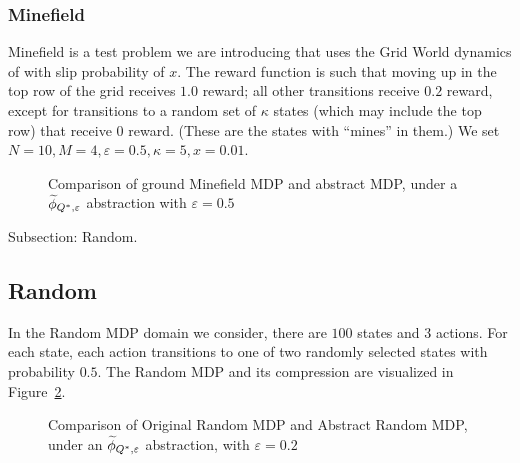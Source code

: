 \subsubsection{Minefield}
Minefield is a test problem we are introducing that uses the Grid World dynamics of \citet{russell1995modern} with slip probability of $x$. The reward function is such that moving up in the top row of the grid receives $1.0$ reward; all other transitions receive $0.2$ reward, except for transitions to a random set of $\kappa$ states (which may include the top row) that receive $0$ reward. (These are the states with ``mines'' in them.) We set $N=10, M=4, \varepsilon=0.5, \kappa = 5, x = 0.01$.
\begin{figure}[h]
\centering
{}
\hspace{6mm}
\caption{Comparison of ground Minefield \ac{MDP} and abstract \ac{MDP}, under a $\widetilde \phi_{Q^*,\varepsilon}$ abstraction with $
\varepsilon=0.5$}
\label{fig:minefield-vis}
\end{figure} 
 Subsection: Random.
\subsection{Random}
In the Random \ac{MDP} domain we consider, there are $100$ states and $3$ actions. For each state, each action transitions to one of two randomly selected states with probability $0.5$. The Random MDP and its compression are visualized in Figure~\ref{fig:minefield-visual}.

\begin{figure}[h]
\centering
{}
\hspace{6mm}
\label{fig:minefield-visual}
\caption{Comparison of Original Random MDP and Abstract Random MDP, under an $\widetilde \phi_{Q^*,\varepsilon}$ abstraction, with $\varepsilon=0.2$}
\end{figure} 
